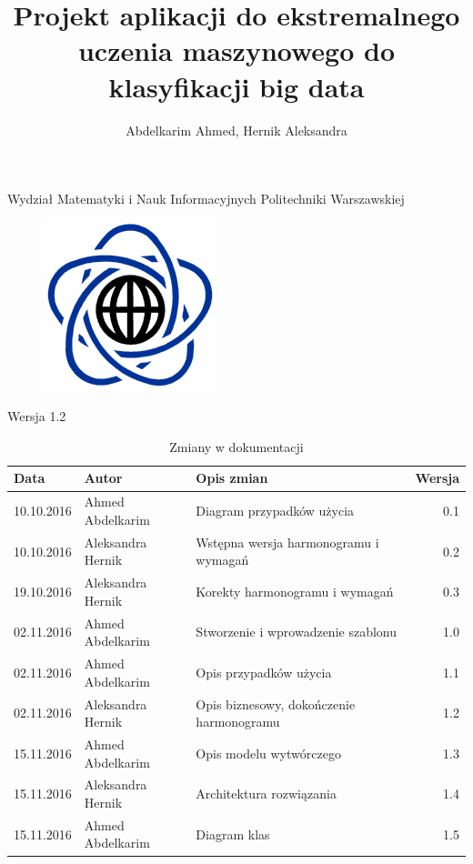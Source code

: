 \documentclass{article}
\title{Projekt aplikacji do ekstremalnego uczenia maszynowego do klasyfikacji big data}
\author{Abdelkarim Ahmed, Hernik Aleksandra}
\begin{document}
Wydział Matematyki i Nauk Informacyjnych Politechniki Warszawskiej
\begin{figure}[H]
\begin{center}
\includegraphics[scale=0.5]{MiNI.png}
\end{center}
\end{figure}
\vspace*{\fill}
\begin{center}
\begin{minipage}{.9\textwidth}
\maketitle
\begin{center}Wersja 1.2\end{center}
\end{minipage}
\end{center}
\vfill %
\clearpage
\noindent
\begin{table}[H]
\caption{Zmiany w dokumentacji}
\hspace*{-1cm}
\begin{tabular}{|l|l|l|r|}
\hline
\textbf{Data} & \textbf{Autor} & \textbf{Opis zmian} & \textbf{Wersja} \\
\hline
10.10.2016 & Ahmed Abdelkarim & Diagram przypadków użycia & 0.1 \\
10.10.2016 & Aleksandra Hernik & Wstępna wersja harmonogramu i wymagań & 0.2 \\
19.10.2016 & Aleksandra Hernik & Korekty harmonogramu i wymagań & 0.3 \\
02.11.2016 & Ahmed Abdelkarim & Stworzenie i wprowadzenie szablonu & 1.0 \\
02.11.2016 & Ahmed Abdelkarim & Opis przypadków użycia & 1.1 \\
02.11.2016 & Aleksandra Hernik & Opis biznesowy, dokończenie harmonogramu & 1.2 \\
15.11.2016 & Ahmed Abdelkarim & Opis modelu wytwórczego & 1.3 \\
15.11.2016 & Aleksandra Hernik & Architektura rozwiązania & 1.4 \\
15.11.2016 & Ahmed Abdelkarim & Diagram klas & 1.5 \\
\hline
\end{tabular}
\end{table}
\tableofcontents
\clearpage
\end{document}
